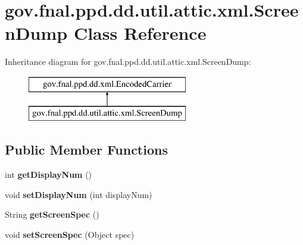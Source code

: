\hypertarget{classgov_1_1fnal_1_1ppd_1_1dd_1_1util_1_1attic_1_1xml_1_1ScreenDump}{\section{gov.\-fnal.\-ppd.\-dd.\-util.\-attic.\-xml.\-Screen\-Dump Class Reference}
\label{classgov_1_1fnal_1_1ppd_1_1dd_1_1util_1_1attic_1_1xml_1_1ScreenDump}
}
Inheritance diagram for gov.\-fnal.\-ppd.\-dd.\-util.\-attic.\-xml.\-Screen\-Dump\-:\begin{figure}[H]
\begin{center}
\leavevmode
\includegraphics[height=2.000000cm]{classgov_1_1fnal_1_1ppd_1_1dd_1_1util_1_1attic_1_1xml_1_1ScreenDump}
\end{center}
\end{figure}
\subsection*{Public Member Functions}
\begin{DoxyCompactItemize}
\item 
\hypertarget{classgov_1_1fnal_1_1ppd_1_1dd_1_1util_1_1attic_1_1xml_1_1ScreenDump_a6ed773a9b533c188f22cd73a01ef31d7}{int {\bfseries get\-Display\-Num} ()}\label{classgov_1_1fnal_1_1ppd_1_1dd_1_1util_1_1attic_1_1xml_1_1ScreenDump_a6ed773a9b533c188f22cd73a01ef31d7}

\item 
\hypertarget{classgov_1_1fnal_1_1ppd_1_1dd_1_1util_1_1attic_1_1xml_1_1ScreenDump_a56d713db0d42cd469f4e85e6bb7850de}{void {\bfseries set\-Display\-Num} (int display\-Num)}\label{classgov_1_1fnal_1_1ppd_1_1dd_1_1util_1_1attic_1_1xml_1_1ScreenDump_a56d713db0d42cd469f4e85e6bb7850de}

\item 
\hypertarget{classgov_1_1fnal_1_1ppd_1_1dd_1_1util_1_1attic_1_1xml_1_1ScreenDump_a9d1d61fa13d65d7816aac84aabf0814e}{String {\bfseries get\-Screen\-Spec} ()}\label{classgov_1_1fnal_1_1ppd_1_1dd_1_1util_1_1attic_1_1xml_1_1ScreenDump_a9d1d61fa13d65d7816aac84aabf0814e}

\item 
\hypertarget{classgov_1_1fnal_1_1ppd_1_1dd_1_1util_1_1attic_1_1xml_1_1ScreenDump_aae100f2ac1ee0db78fe217f6b51da138}{void {\bfseries set\-Screen\-Spec} (Object spec)}\label{classgov_1_1fnal_1_1ppd_1_1dd_1_1util_1_1attic_1_1xml_1_1ScreenDump_aae100f2ac1ee0db78fe217f6b51da138}

\end{DoxyCompactItemize}
